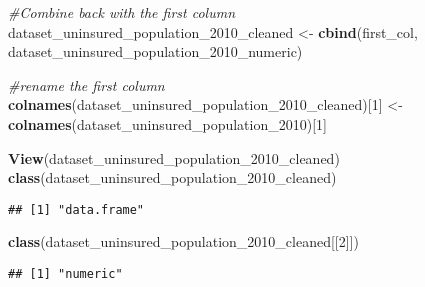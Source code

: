 \documentclass[
]{article}
\newenvironment{Shaded}{\begin{snugshade}}{\end{snugshade}}
\newcommand{\CommentTok}[1]{\textcolor[rgb]{0.56,0.35,0.01}{\textit{#1}}}
\newcommand{\DecValTok}[1]{\textcolor[rgb]{0.00,0.00,0.81}{#1}}
\newcommand{\FunctionTok}[1]{\textcolor[rgb]{0.13,0.29,0.53}{\textbf{#1}}}
\newcommand{\NormalTok}[1]{#1}
\newcommand{\OtherTok}[1]{\textcolor[rgb]{0.56,0.35,0.01}{#1}}
\begin{document}
\begin{Shaded}
\begin{Highlighting}[]
\CommentTok{\#Combine back with the first column}
\NormalTok{dataset\_uninsured\_population\_2010\_cleaned }\OtherTok{\textless{}{-}} \FunctionTok{cbind}\NormalTok{(first\_col, dataset\_uninsured\_population\_2010\_numeric)}

\CommentTok{\#rename the first column}
\FunctionTok{colnames}\NormalTok{(dataset\_uninsured\_population\_2010\_cleaned)[}\DecValTok{1}\NormalTok{] }\OtherTok{\textless{}{-}} \FunctionTok{colnames}\NormalTok{(dataset\_uninsured\_population\_2010)[}\DecValTok{1}\NormalTok{]}

\FunctionTok{View}\NormalTok{(dataset\_uninsured\_population\_2010\_cleaned)}
\FunctionTok{class}\NormalTok{(dataset\_uninsured\_population\_2010\_cleaned)}
\end{Highlighting}
\end{Shaded}

\begin{verbatim}
## [1] "data.frame"
\end{verbatim}

\begin{Shaded}
\begin{Highlighting}[]
\FunctionTok{class}\NormalTok{(dataset\_uninsured\_population\_2010\_cleaned[[}\DecValTok{2}\NormalTok{]])}
\end{Highlighting}
\end{Shaded}

\begin{verbatim}
## [1] "numeric"
\end{verbatim}
\end{document}
